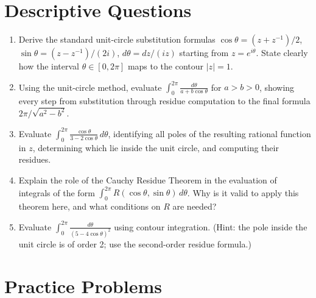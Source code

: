 \documentclass[12pt,a4paper]{article}
\begin{document}
\section{Descriptive Questions}

\begin{enumerate}
  \item Derive the standard unit-circle substitution formulas
        $\cos\theta = (z+z^{-1})/2$, $\sin\theta = (z-z^{-1})/(2i)$,
        $d\theta = dz/(iz)$ starting from $z = e^{i\theta}$.
        State clearly how the interval $\theta \in [0,2\pi]$ maps to the
        contour $|z| = 1$.

  \item Using the unit-circle method, evaluate
        $\displaystyle\int_0^{2\pi}\frac{d\theta}{a+b\cos\theta}$ for $a > b > 0$,
        showing every step from substitution through residue computation
        to the final formula $2\pi/\sqrt{a^2-b^2}$.

  \item Evaluate $\displaystyle\int_0^{2\pi}\frac{\cos\theta}{3-2\cos\theta}\,d\theta$,
        identifying all poles of the resulting rational function in $z$,
        determining which lie inside the unit circle, and computing their residues.

  \item Explain the role of the Cauchy Residue Theorem in the evaluation of
        integrals of the form $\displaystyle\int_0^{2\pi} R(\cos\theta,\sin\theta)\,d\theta$.
        Why is it valid to apply this theorem here, and what conditions on $R$
        are needed?

  \item Evaluate $\displaystyle\int_0^{2\pi}\frac{d\theta}{(5-4\cos\theta)^2}$
        using contour integration. (Hint: the pole inside the unit circle is
        of order 2; use the second-order residue formula.)
\end{enumerate}

\section{Practice Problems}
\end{document}
